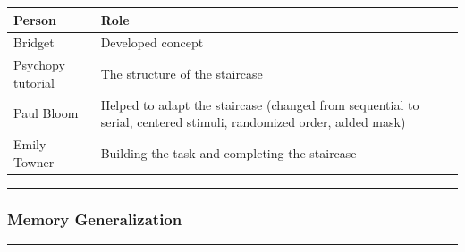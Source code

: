 \documentclass[]{book}
\begin{document}
\begin{longtable}[]{@{}ll@{}}
\toprule
\begin{minipage}[b]{0.12\columnwidth}\raggedright
Person\strut
\end{minipage} & \begin{minipage}[b]{0.82\columnwidth}\raggedright
Role\strut
\end{minipage}\tabularnewline
\midrule
\endhead
\begin{minipage}[t]{0.12\columnwidth}\raggedright
Bridget\strut
\end{minipage} & \begin{minipage}[t]{0.82\columnwidth}\raggedright
Developed concept\strut
\end{minipage}\tabularnewline
\begin{minipage}[t]{0.12\columnwidth}\raggedright
Psychopy tutorial\strut
\end{minipage} & \begin{minipage}[t]{0.82\columnwidth}\raggedright
The structure of the staircase\strut
\end{minipage}\tabularnewline
\begin{minipage}[t]{0.12\columnwidth}\raggedright
Paul Bloom\strut
\end{minipage} & \begin{minipage}[t]{0.82\columnwidth}\raggedright
Helped to adapt the staircase (changed from sequential to serial, centered stimuli, randomized order, added mask)\strut
\end{minipage}\tabularnewline
\begin{minipage}[t]{0.12\columnwidth}\raggedright
Emily Towner\strut
\end{minipage} & \begin{minipage}[t]{0.82\columnwidth}\raggedright
Building the task and completing the staircase\strut
\end{minipage}\tabularnewline
\bottomrule
\end{longtable}

\begin{center}\rule{0.5\linewidth}{0.5pt}\end{center}

\hypertarget{memory-generalization}{%
\subsubsection{Memory Generalization}\label{memory-generalization}}

\begin{center}\rule{0.5\linewidth}{0.5pt}\end{center}
\end{document}
